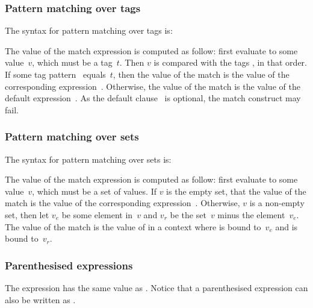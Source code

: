 \subsubsection*{Pattern matching over tags}
The syntax for pattern matching over tags is:
\begin{center}
\end{center}
The value of the match expression is computed as follow: first evaluate
 to some value~$v$, which must be a tag~$t$.
Then $v$ is compared with the tags ,
in that order.
If some tag pattern~ equals~$t$, then the value of the
match is the value of the corresponding expression~.
Otherwise, the value of the match is the value of the default
expression~.
As the default clause~ is optional,
the match construct may fail.

\subsubsection*{Pattern matching over sets}
The syntax for pattern matching over sets is:
\begin{center}
\end{center}
The value of the match expression is computed as follow: first evaluate
 to some value~$v$, which must be a set of values.
If $v$ is the empty set, that the value of the match is the
value of the corresponding expression~.
Otherwise, $v$ is a non-empty set, then let $v_e$ be some element in~$v$
and $v_r$ be the set~$v$ minus the element~$v_e$.
The value of the match is the value of  in a context
where  is bound to~$v_e$ and  is bound
to~$v_r$.


\subsubsection*{Parenthesised expressions}
The expression 
has the same value as .
Notice that a parenthesised expression
can also be written as  .

